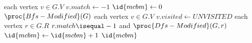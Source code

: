 \begin{codebox}
\li \For each vertex $v \in G.V$
\li \Do $v.match \gets -1$ \End
\li $\id{mcbm} \gets 0$
\li \While $\proc{Bfs-Modified}(G)$ \Do
\li \For each vertex $v \in G.V$ \Do
\li $v.visited \gets UNVISITED$ \End
\li \For each vertex $r \in G.R$ \Do
\li \If $r.match \isequal -1$ and $\proc{Dfs-Modified}(G, r)$ \Then
\li $\id{mcbm} \gets \id{mcbm} + 1$ \End \End \End
\li \Return $\id{mcbm}$
\end{codebox}